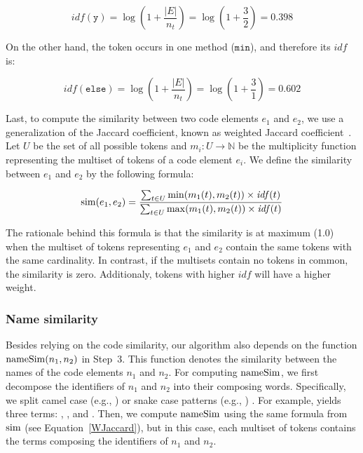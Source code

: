\[
\mathit{idf}(\mathtt{y}) = 
\log (1 + \frac{|E|}{n_t}) = 
\log (1 + \frac{3}{2}) = 0.398
\]

On the other hand, the token  occurs in one method ($\mathtt{min}$), and therefore its $\mathit{idf}$ is:

\[
\mathit{idf}(\mathtt{else}) = 
\log (1 + \frac{|E|}{n_t}) = 
\log (1 + \frac{3}{1}) = 0.602
\]

Last, to compute the similarity between two code elements $e_1$ and $e_2$, we use a generalization of the Jaccard coefficient, known as weighted Jaccard coefficient~\cite{chierichetti2010finding}.
Let $U$ be the set of all possible tokens and $m_i: U \to \mathbb{N}$ be the multiplicity function representing the multiset of tokens of a code element $e_i$.
We define the similarity between $e_1$ and $e_2$ by the following formula:


\begin{align}
\label{WJaccard}
\rdsim(e_1, e_2) = \frac{\sum_{t \in U} \min(m_1(t), m_2(t)) \times \mathit{idf}(t) }
                        {\sum_{t \in U} \max(m_1(t), m_2(t)) \times \mathit{idf}(t) }
\end{align}

The rationale behind this formula is that the similarity is at maximum (1.0) when the multiset of tokens representing $e_1$ and $e_2$ contain the same tokens with the same cardinality. In contrast, if the multisets contain no tokens in common, the similarity is zero. Additionaly, tokens with higher $\mathit{idf}$ will have a higher weight.


\subsubsection{Name similarity}
\label{SecNameSim}

Besides relying on the code similarity, our algorithm also depends on the function $\operatorname{nameSim}(n_1, n_2)$ in Step~3.
This function denotes the similarity between the names of the code elements $n_1$ and $n_2$.
For computing $\operatorname{nameSim}$, we first decompose the identifiers of $n_1$ and $n_2$ into their composing words. Specifically, we split camel case (e.g., ) or snake case patterns (e.g., ) . For example,  yields three terms: , , and .
Then, we compute $\operatorname{nameSim}$ using the same formula from $\operatorname{sim}$ (see Equation~\ref{WJaccard}), but in this case, each multiset of tokens contains the terms composing the identifiers of $n_1$ and $n_2$.


